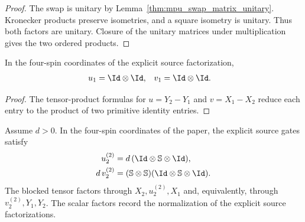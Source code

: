 \begin{proof}\leanok
    The swap is unitary by Lemma~\ref{thm:mpu_swap_matrix_unitary}. Kronecker
    products preserve isometries, and a square isometry is unitary. Thus both
    factors are unitary. Closure of the unitary matrices under multiplication
    gives the two ordered products.
\end{proof}

\begin{lemma}
    \label{thm:threeMPU_supplied_source_gates_one}
    \leanok
    In the four-spin coordinates of the explicit source factorization,
    \begin{align}
        u_1 & =\Id\otimes\Id,
            & v_1             & =\Id\otimes\Id.
    \end{align}
\end{lemma}

\begin{proof}\leanok
    The tensor-product formulas for $u=Y_2\mathbin{-}Y_1$ and
    $v=X_1\mathbin{-}X_2$ reduce each entry to the product of two primitive
    identity entries.
\end{proof}

\begin{lemma}
    \label{thm:threeMPU_U2_supplied_source_gates_two}
    \leanok
    Assume $d>0$. In the four-spin coordinates of the paper, the explicit
    source gates satisfy
    \begin{align}
        u_2^{(2)}    & =d\,(\Id\otimes\mathbb S\otimes\Id), \\
        d\,v_2^{(2)} & =(\mathbb S\otimes\mathbb S)
        (\Id\otimes\mathbb S\otimes\Id).
    \end{align}
    The blocked tensor factors through $X_2,u_2^{(2)},X_1$ and, equivalently,
    through $v_2^{(2)},Y_1,Y_2$. The scalar factors record the normalization of
    the explicit source factorizations.
\end{lemma}

